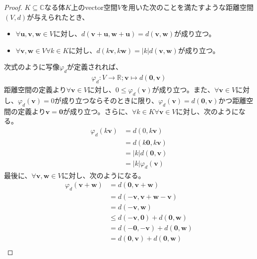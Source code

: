 \documentclass[dvipdfmx]{jsarticle}
\begin{document}
\begin{proof}
$K \subseteq \mathbb{C}$なる体$K$上のvector空間$V$を用いた次のことを満たすような距離空間$(V,d)$が与えられたとき、
\begin{itemize}
\item
  $\forall\mathbf{u},\mathbf{v},\mathbf{w} \in V$に対し、$d\left( \mathbf{v + u,w + u} \right) = d\left( \mathbf{v,w} \right)$が成り立つ。
\item
  $\forall\mathbf{v,w} \in V\forall k \in K$に対し、$d\left( k\mathbf{v},k\mathbf{w} \right) = |k|d\left( \mathbf{v,w} \right)$が成り立つ。
\end{itemize}
次式のように写像$\varphi_{d}$が定義されれば、
\begin{align*}
\varphi_{d}:V \rightarrow \mathbb{R};\mathbf{v} \mapsto d\left( \mathbf{0},\mathbf{v} \right)
\end{align*}
距離空間の定義より$\forall\mathbf{v} \in V$に対し、$0 \leq \varphi_{d}\left( \mathbf{v} \right)$が成り立つ。また、$\forall\mathbf{v} \in V$に対し、$\varphi_{d}\left( \mathbf{v} \right) = 0$が成り立つならそのときに限り、$\varphi_{d}\left( \mathbf{v} \right) = d\left( \mathbf{0},\mathbf{v} \right)$かつ距離空間の定義より$\mathbf{v} = \mathbf{0}$が成り立つ。さらに、$\forall k \in K\forall\mathbf{v} \in V$に対し、次のようになる。
\begin{align*}
\varphi_{d}\left( k\mathbf{v} \right) &= d\left( 0,k\mathbf{v} \right)\\
&= d\left( k\mathbf{0},k\mathbf{v} \right)\\
&= |k|d\left( \mathbf{0},\mathbf{v} \right)\\
&= |k|\varphi_{d}\left( \mathbf{v} \right)
\end{align*}
最後に、$\forall\mathbf{v},\mathbf{w} \in V$に対し、次のようになる。
\begin{align*}
\varphi_{d}\left( \mathbf{v} + \mathbf{w} \right) &= d\left( \mathbf{0},\mathbf{v} + \mathbf{w} \right)\\
&= d\left( - \mathbf{v},\mathbf{v} + \mathbf{w} - \mathbf{v} \right)\\
&= d\left( - \mathbf{v},\mathbf{w} \right)\\
&\leq d\left( - \mathbf{v},\mathbf{0} \right) + d\left( \mathbf{0},\mathbf{w} \right)\\
&= d\left( \mathbf{- 0}, - \mathbf{v} \right) + d\left( \mathbf{0},\mathbf{w} \right)\\
&= d\left( \mathbf{0},\mathbf{v} \right) + d\left( \mathbf{0},\mathbf{w} \right)\\

\end{align*}
\end{proof}
\end{document}
